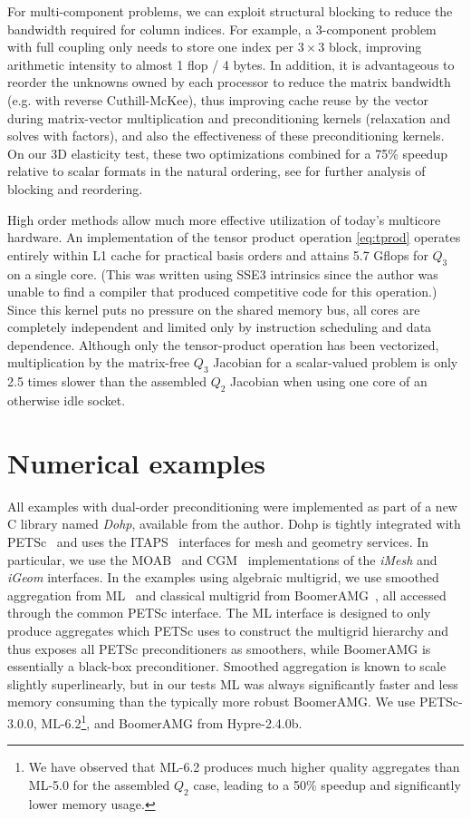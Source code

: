 For multi-component problems, we can exploit structural blocking to reduce the bandwidth required for column indices.
For example, a 3-component problem with full coupling only needs to store one index per $3\times 3$ block, improving
arithmetic intensity to almost 1 flop / 4 bytes.  In addition, it is advantageous to reorder the unknowns owned by each
processor to reduce the matrix bandwidth (e.g. with reverse Cuthill-McKee), thus improving cache reuse by the vector
during matrix-vector multiplication and preconditioning kernels (relaxation and solves with factors), and also the
effectiveness of these preconditioning kernels.  On our 3D elasticity test, these two optimizations combined for a 75\%
speedup relative to scalar formats in the natural ordering, see \citet{gropp2000pmt} for further analysis of blocking and
reordering.

High order methods allow much more effective utilization of today's multicore hardware.  An implementation of the tensor
product operation \eqref{eq:tprod} operates entirely within L1 cache for practical basis orders and attains 5.7 Gflops
for $Q_3$ on a single core.  (This was written using SSE3 intrinsics since the author was unable to find a compiler that
produced competitive code for this operation.)  Since this kernel puts no pressure on the shared memory bus, all cores
are completely independent and limited only by instruction scheduling and data dependence.  Although only the
tensor-product operation has been vectorized, multiplication by the matrix-free $Q_3$ Jacobian for a scalar-valued
problem is only 2.5 times slower than the assembled $Q_2$ Jacobian when using one core of an otherwise idle socket.

\section{Numerical examples}\label{sec:examples}
All examples with dual-order preconditioning were implemented as part of a new C library named \emph{Dohp}, available
from the author.
Dohp is tightly integrated with PETSc~\citep{petsc-user-ref} and uses the ITAPS~\citep{itapsproject}
interfaces for mesh and geometry services.  In particular, we use the MOAB~\citep{moab} and CGM~\citep{cgm}
implementations of the \emph{iMesh} and \emph{iGeom} interfaces.  In the examples using algebraic multigrid, we use
smoothed aggregation from ML~\citep{ml-guide} and classical multigrid from BoomerAMG~\citep{henson2002bpa}, all accessed
through the common PETSc interface.  The ML interface is designed to only produce aggregates which PETSc uses to
construct the multigrid hierarchy and thus exposes all PETSc preconditioners as smoothers, while BoomerAMG is
essentially a black-box preconditioner.  Smoothed aggregation is known to scale slightly superlinearly, but in our tests
ML was always significantly faster and less memory consuming than the typically more robust BoomerAMG.  We use
PETSc-3.0.0, ML-6.2\footnote{We have observed that ML-6.2 produces much higher quality aggregates than ML-5.0 for the
  assembled $Q_2$ case, leading to a 50\% speedup and significantly lower memory usage.}, and BoomerAMG from
Hypre-2.4.0b.

